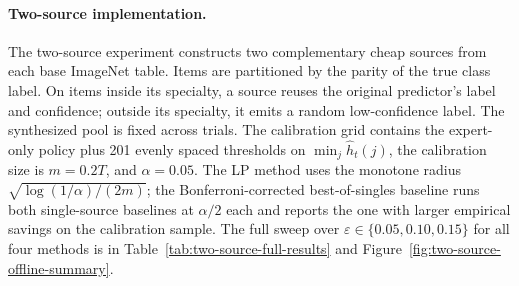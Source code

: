 \documentclass[11pt]{article}
\newcommand{\hath}{\widehat h}
\newcommand{\eps}{\varepsilon}
\begin{document}
\paragraph{Two-source implementation.}
The two-source experiment constructs two complementary cheap sources from each
base ImageNet table. Items are partitioned by the parity of the true class
label. On items inside its specialty, a source reuses the original predictor's
label and confidence; outside its specialty, it emits a random low-confidence
label. The synthesized pool is fixed across trials. The calibration grid
contains the expert-only policy plus 201 evenly spaced thresholds on
$\min_j\hath_{t}(j)$, the calibration size is $m=0.2T$, and $\alpha=0.05$.
The LP method uses the monotone radius
$\sqrt{\log(1/\alpha)/(2m)}$; the
Bonferroni-corrected best-of-singles baseline runs both single-source
baselines at $\alpha/2$ each and reports the one with larger empirical
savings on the calibration sample.
The full sweep over $\eps\in\{0.05,0.10,0.15\}$ for all four methods is in
Table~\ref{tab:two-source-full-results} and
Figure~\ref{fig:two-source-offline-summary}.
\end{document}
